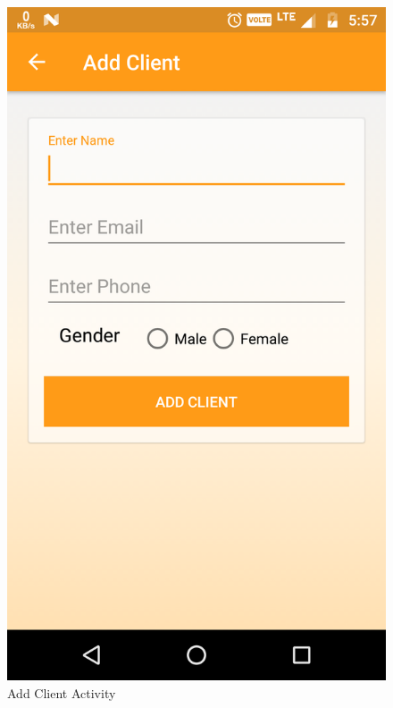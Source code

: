 \\
\begin{figure}[h]
	\centering
	\includegraphics[width=0.7\linewidth]{AddClient}
	\caption{Add Client Activity}
\end{figure}
\pagebreak

